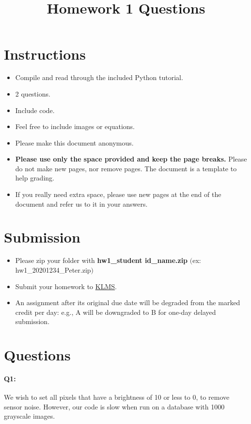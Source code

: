 \documentclass[11pt]{article}
\date{}
\title{\vspace{-1cm}Homework 1 Questions}
\begin{document}
\maketitle
\vspace{-2cm}
\thispagestyle{fancy}

\section*{Instructions}
\begin{itemize}
  \item Compile and read through the included Python tutorial.
  \item 2 questions.
  \item Include code.
  \item Feel free to include images or equations.
  \item Please make this document anonymous.
  \item \textbf{Please use only the space provided and keep the page breaks.} Please do not make new pages, nor remove pages. The document is a template to help grading.
  \item If you really need extra space, please use new pages at the end of the document and refer us to it in your answers.
\end{itemize}


\section*{Submission}
\begin{itemize}
	\item Please zip your folder with \textbf{hw1\_student id\_name.zip} $($ex: hw1\_20201234\_Peter.zip$)$
	\item Submit your homework to \href{http://klms.kaist.ac.kr/course/view.php?id=129906}{KLMS}.
	\item An assignment after its original due date will be degraded from the marked credit per day: e.g., A will be downgraded to B for one-day delayed submission.
\end{itemize}

\pagebreak


\section*{Questions}



\paragraph{Q1:} We wish to set all pixels that have a brightness of 10 or less to 0, to remove sensor noise. However, our code is slow when run on a database with 1000 grayscale images.
\end{document}
